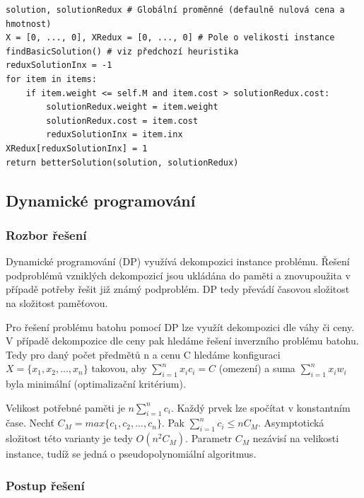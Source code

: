 \documentclass[12pt]{article}
\begin{document}
\begin{listing}[ht]
    \begin{verbatim}
solution, solutionRedux # Globální proměnné (defaulně nulová cena a hmotnost)
X = [0, ..., 0], XRedux = [0, ..., 0] # Pole o velikosti instance
findBasicSolution() # viz předchozí heuristika
reduxSolutionInx = -1
for item in items:
    if item.weight <= self.M and item.cost > solutionRedux.cost:
        solutionRedux.weight = item.weight
        solutionRedux.cost = item.cost
        reduxSolutionInx = item.inx
XRedux[reduxSolutionInx] = 1
return betterSolution(solution, solutionRedux)
    \end{verbatim}
\end{listing}

\subsection{Dynamické programování}

\subsubsection{Rozbor řešení}

Dynamické programování (DP) využívá dekompozici instance problému. Řešení podproblémů vzniklých dekompozicí jsou ukládána do paměti a znovupoužita v případě potřeby řešit již známý podproblém. DP tedy převádí časovou složitost na složitost paměťovou.

Pro řešení problému batohu pomocí DP lze využít dekompozici dle váhy či ceny. V případě dekompozice dle ceny pak hledáme řešení inverzního problému batohu. Tedy pro daný počet předmětů n a cenu C hledáme konfiguraci \( X=\{x_1,x_2,…,x_n\} \) takovou, aby \( \sum_{i=1}^{n} x_ic_i = C \) (omezení) a suma \( \sum_{i=1}^{n} x_iw_i \) byla minimální (optimalizační kritérium).

Velikost potřebné paměti je \(n \sum_{i=1}^{n}c_i\). Každý prvek lze spočítat v konstantním čase. Nechť \(C_M = max\{c_1, c_2, ..., c_n\}\). Pak \(\sum_{i=1}^{n}c_i \leq n C_M\). Asymptotická složitost této varianty je tedy \( O(n^2 C_M) \). Parametr $C_M$ nezávisí na velikosti instance, tudíž se jedná o pseudopolynomiální algoritmus.

\subsubsection{Postup řešení}
\end{document}
